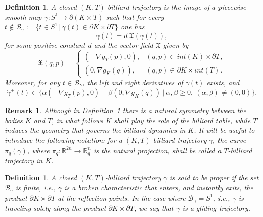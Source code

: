 \documentclass[11pt]{article}
\newtheorem{remark}[lemma]{Remark}
\newtheorem{definition}[lemma]{Definition}
\begin{document}
{\begin{definition} \label{def-of-periodic-traj}
A closed $(K,T)$-billiard trajectory is the image of a piecewise smooth
map $\gamma \colon S^1 \rightarrow \partial (K \times T) $
such that for every  $t \notin {\mathcal B}_{\gamma}:= \{ t
\in S^1 \, | \, \gamma(t) \in \partial K \times \partial T \}$ one has
\begin{equation*}
\dot \gamma(t) = d \, {\mathfrak X}(\gamma(t)),  \end{equation*} for some positive
 constant $d$ and the vector field ${\mathfrak X}$  given by
\begin{equation*}
{\mathfrak X}(q,p) = \left\{
\begin{array}{ll}
(-\nabla g_T(p) ,0), &  (q,p) \in int(K) \times \partial T,\\
(0,\nabla g_K(q)), & (q,p) \in \partial K \times int(T).
\end{array} \right.
\end{equation*}
Moreover, for any $t \in {\mathcal B}_{\gamma}$, the left and right
derivatives of $\gamma(t)$ exists, and
\begin{equation} \label{eq-the-cone}
\dot \gamma^{\pm}(t) \in \{   \alpha (-\nabla g_T(p) ,0) + \beta
(0,\nabla g_K(q))    \ | \ \alpha,\beta \geq 0,  \ (\alpha, \beta) \neq (0,0) \}.
\end{equation}
\end{definition}

\begin{remark}
{\rm Although  in Definition~\ref{def-of-periodic-traj} there is a natural symmetry between the  bodies $K$ and $T$, 
in what follows  $K$ shall play the role of the billiard table, while  $T$ induces the geometry that governs the billiard dynamics in $K$.
It will be useful to introduce the following notation: 
for a $(K,T)$-billiard trajectory $\gamma$, the curve $\pi_q(\gamma)$,  where $\pi_q \colon {\mathbb R}^{2n} \rightarrow {\mathbb R}^n_q$ is the natural projection, 
shall be called a $T$-billiard trajectory in $K$.
} \end{remark}

\begin{definition} %
A closed $(K,T)$-billiard trajectory $\gamma$ is said to be {\it proper}
if the set ${\mathcal B}_{\gamma}$ is finite, i.e., $\gamma$ is a
broken characteristic that enters, and instantly exits, the product
$\partial K \times \partial T$ at the reflection points.
In the case where ${\mathcal B}_{\gamma} = S^1$, i.e., $\gamma$ is traveling
solely along the product $\partial K \times \partial T$,
 we say that $\gamma$ is a gliding trajectory.
\end{definition}

}
\end{document}
